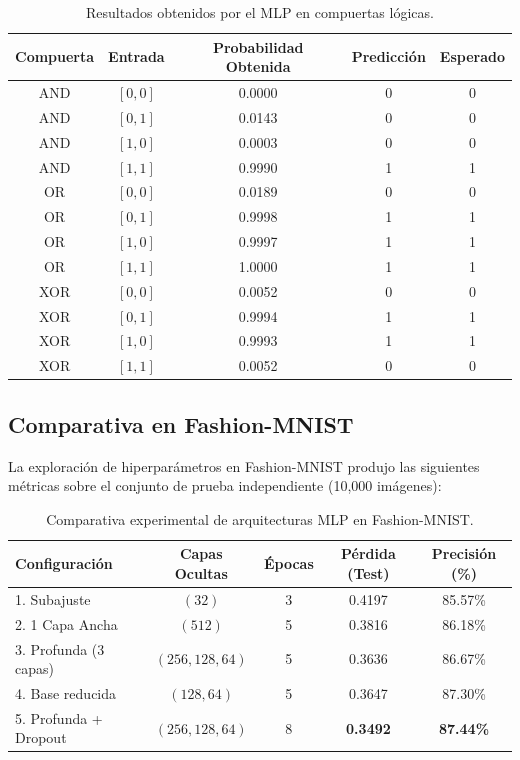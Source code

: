 \documentclass[12pt]{article}
\begin{document}
	\begin{table}[H]
		\centering
		\caption{Resultados obtenidos por el MLP en compuertas lógicas.}
		\begin{tabular}{ccccc}
			\toprule
			\textbf{Compuerta} & \textbf{Entrada} & \textbf{Probabilidad Obtenida} & \textbf{Predicción} & \textbf{Esperado} \\
			\midrule
			AND & $[0, 0]$ & 0.0000 & 0 & 0 \\
			AND & $[0, 1]$ & 0.0143 & 0 & 0 \\
			AND & $[1, 0]$ & 0.0003 & 0 & 0 \\
			AND & $[1, 1]$ & 0.9990 & 1 & 1 \\
			\midrule
			OR  & $[0, 0]$ & 0.0189 & 0 & 0 \\
			OR  & $[0, 1]$ & 0.9998 & 1 & 1 \\
			OR  & $[1, 0]$ & 0.9997 & 1 & 1 \\
			OR  & $[1, 1]$ & 1.0000 & 1 & 1 \\
			\midrule
			XOR & $[0, 0]$ & 0.0052 & 0 & 0 \\
			XOR & $[0, 1]$ & 0.9994 & 1 & 1 \\
			XOR & $[1, 0]$ & 0.9993 & 1 & 1 \\
			XOR & $[1, 1]$ & 0.0052 & 0 & 0 \\
			\bottomrule
		\end{tabular}
	\end{table}
	
	\subsection{Comparativa en Fashion-MNIST}
	La exploración de hiperparámetros en Fashion-MNIST produjo las siguientes métricas sobre el conjunto de prueba independiente (10,000 imágenes):
	
	\begin{table}[H]
		\centering
		\caption{Comparativa experimental de arquitecturas MLP en Fashion-MNIST.}
		\begin{tabular}{lcccc}
			\toprule
			\textbf{Configuración} & \textbf{Capas Ocultas} & \textbf{Épocas} & \textbf{Pérdida (Test)} & \textbf{Precisión (\%)} \\
			\midrule
			1. Subajuste            & $(32)$               & 3 & 0.4197 & 85.57\% \\
			2. 1 Capa Ancha         & $(512)$              & 5 & 0.3816 & 86.18\% \\
			3. Profunda (3 capas)   & $(256, 128, 64)$     & 5 & 0.3636 & 86.67\% \\
			4. Base reducida        & $(128, 64)$          & 5 & 0.3647 & 87.30\% \\
			5. Profunda + Dropout   & $(256, 128, 64)$     & 8 & \textbf{0.3492} & \textbf{87.44\%} \\
			\bottomrule
		\end{tabular}
	\end{table}
	
\end{document}
